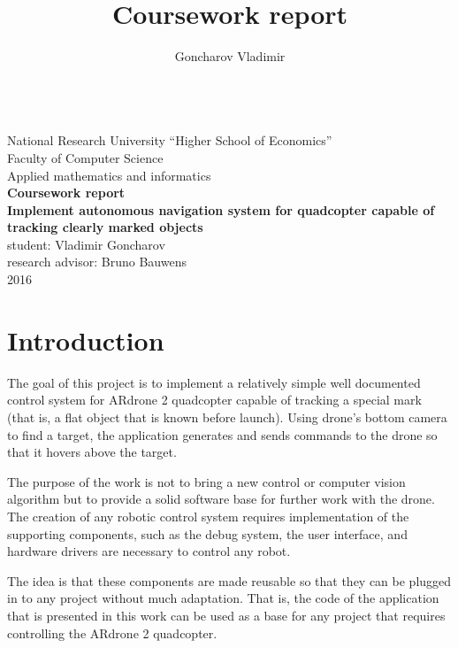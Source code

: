 \documentclass[12pt]{article}
\begin{document}
    \title{\textbf{Coursework report}}
    \author{Goncharov Vladimir}

    \thispagestyle{empty}

    \begin{center}
    ~\\[10ex]
    {National Research University ``Higher School of Economics''}\\[1.1ex]
    Faculty of Computer Science\\[1.1ex]
    Applied mathematics and informatics\\[15.0ex]
    {\LARGE\bf Coursework report}\\[4.0ex]
    {\Large\bf Implement autonomous navigation system for quadcopter capable of tracking clearly marked objects}\\[4.0ex]
    student: Vladimir Goncharov\\
    research advisor: Bruno Bauwens\\[4.0ex]
    2016
    \end{center}

    \newpage

    \thispagestyle{empty}


    \tableofcontents

    \newpage

    \setcounter{page}{1}

    \section{Introduction}

    The goal of this project is to implement a relatively simple
    well documented control system for ARdrone 2 quadcopter
    capable of tracking a special mark (that is, a flat object that is known
    before launch).
    Using drone's bottom camera to find a target, the application generates
    and sends commands to the drone so that it hovers above the target.

    The purpose of the work is not to bring a new control or computer vision
    algorithm but to provide a solid software base for further work
    with the drone. The creation of any robotic control system requires
    implementation of the supporting components, such as
    the debug system, the user interface, and hardware drivers
    are necessary to control any robot.

    The idea is that these components are made reusable so that they
    can be plugged in to any project without much adaptation. That is, the
    code of the application that is presented in this work can be used as
    a base for any project that requires controlling the ARdrone 2
    quadcopter.
\end{document}
